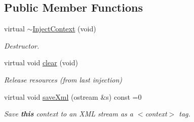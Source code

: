 \subsection*{Public Member Functions}
\begin{DoxyCompactItemize}
\item 
virtual \mbox{\hyperlink{class_inject_context_a2ed6c660fb96a175c1cd21f5b6a0e0ee}{$\sim$\+Inject\+Context}} (void)
\begin{DoxyCompactList}\small\item\em Destructor. \end{DoxyCompactList}\item 
virtual void \mbox{\hyperlink{class_inject_context_a0887ab87dff135345185c628daa0fa23}{clear}} (void)
\begin{DoxyCompactList}\small\item\em Release resources (from last injection) \end{DoxyCompactList}\item 
virtual void \mbox{\hyperlink{class_inject_context_a85884d6d9e18996f0b03aa10a4e11be6}{save\+Xml}} (ostream \&s) const =0
\begin{DoxyCompactList}\small\item\em Save {\bfseries{this}} context to an X\+ML stream as a $<$context$>$ tag. \end{DoxyCompactList}\end{DoxyCompactItemize}
